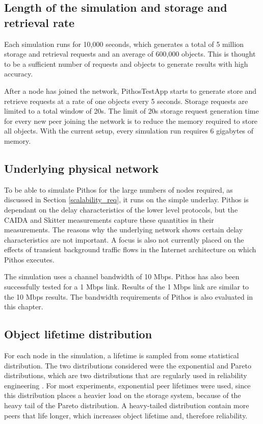 \subsection{Length of the simulation and storage and retrieval rate}
Each simulation runs for 10,000 seconds, which generates a total of 5 million storage and retrieval requests and an average of 600,000 objects. This is thought to be a sufficient number of requests and objects to generate results with high accuracy.

After a node has joined the network, PithosTestApp starts to generate store and retrieve requests at a rate of one objects every 5 seconds. Storage requests are limited to a total window of 20s. The limit of 20s storage request generation time for every new peer joining the network is to reduce the memory required to store all objects. With the current setup, every simulation run requires 6 gigabytes of memory.

\subsection{Underlying physical network}
To be able to simulate Pithos for the large numbers of nodes required, as discussed in Section \ref{scalability_req}, it runs on the simple underlay. Pithos is dependant on the delay characteristics of the lower level protocols, but the CAIDA and Skitter measurements capture these quantities in their measurements. The reasons why the underlying network shows certain delay characteristics are not important. A focus is also not currently placed on the effects of transient background traffic flows in the Internet architecture on which Pithos executes.

The simulation uses a channel bandwidth of 10 Mbps. Pithos has also been successfully tested for a 1 Mbps link. Results of the 1 Mbps link are similar to the 10 Mbps results. The bandwidth requirements of Pithos is also evaluated in this chapter.

\subsection{Object lifetime distribution}
For each node in the simulation, a lifetime is sampled from some statistical distribution. The two distributions considered were the exponential and Pareto distributions, which are two distributions that are regularly used in reliability engineering \cite{rausand2004systemreliability}. For most experiments, exponential peer lifetimes were used, since this distribution places a heavier load on the storage system, because of the heavy tail of the Pareto distribution. A heavy-tailed distribution contain more peers that life longer, which increases object lifetime and, therefore reliability.

